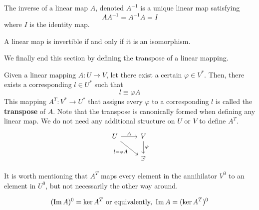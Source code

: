   \begin{definition}[Inverse]
    The inverse of a linear map $A$, denoted $A^{-1}$ is a unique linear map satisfying 
    \begin{equation}
      A A^{-1} = A^{-1} A = I
    \end{equation}
    where $I$ is the identity map. 
  \end{definition}

  \begin{corollary}
    A linear map is invertible if and only if it is an isomorphism. 
  \end{corollary}

  We finally end this section by defining the transpose of a linear mapping. 

  \begin{definition}[Transpose]
    Given a linear mapping $A: U \longrightarrow V$, let there exist a certain $\varphi \in V^*$. Then, there exists a corresponding $l \in U^*$ such that 
    \begin{equation}
      l \equiv \varphi A
    \end{equation}
    This mapping $A^T: V^* \longrightarrow U^*$ that assigns every $\varphi$ to a corresponding $l$ is called the \textbf{transpose} of $A$. Note that the transpose is canonically formed when defining any linear map. We do not need any additional structure on $U$ or $V$ to define $A^T$.
    \[
      \begin{tikzcd}
        U \arrow{r}{A} \arrow[swap]{dr}{l = \varphi A} & V \arrow{d}{\varphi} \\
        & \mathbb{F}
      \end{tikzcd}
    \]
  \end{definition}

  It is worth mentioning that $A^T$ maps every element in the annihilator $V^0$ to an element in $U^0$, but not necessarily the other way around. 

  \begin{theorem}
    \begin{equation}
      (\im A)^0 = \ker A^T \text{ or equivalently, } \im A = (\ker A^T)^0
    \end{equation}
  \end{theorem}


